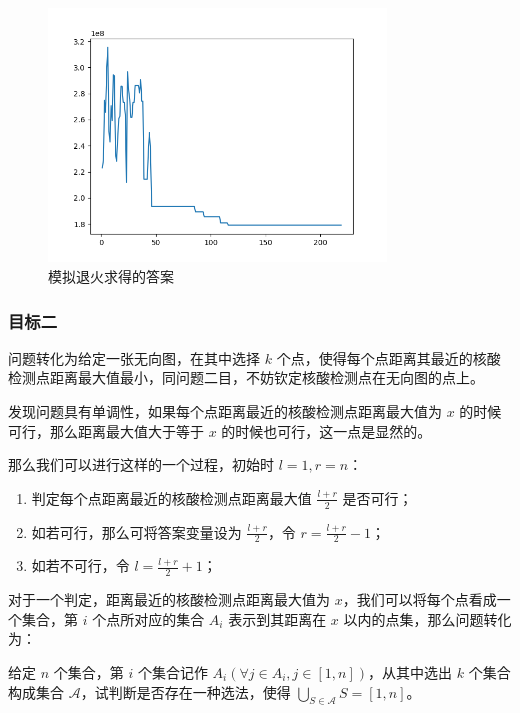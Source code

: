 \documentclass{cumcmthesis}
\begin{document}
\begin{figure}[H]
	\centering
	\includegraphics[width=0.80\textwidth]{images/SA.png}
	\caption{模拟退火求得的答案}
	\label{fig:P3T1-SA}
\end{figure}

\subsubsection{目标二}

问题转化为给定一张无向图，在其中选择 $k$ 个点，使得每个点距离其最近的核酸检测点距离最大值最小，同问题二目，不妨钦定核酸检测点在无向图的点上。

发现问题具有单调性，如果每个点距离最近的核酸检测点距离最大值为 $x$ 的时候可行，那么距离最大值大于等于 $x$ 的时候也可行，这一点是显然的。

那么我们可以进行这样的一个过程，初始时 $l=1,r=n$：

\begin{enumerate}
    \item 判定每个点距离最近的核酸检测点距离最大值 $\frac{l+r}{2}$ 是否可行；
    \item 如若可行，那么可将答案变量设为 $\frac{l+r}{2}$，令 $r = \frac{l+r}{2}-1$；
    \item 如若不可行，令 $l = \frac{l+r}{2} + 1$；
\end{enumerate}

对于一个判定，距离最近的核酸检测点距离最大值为 $x$，我们可以将每个点看成一个集合，第 $i$ 个点所对应的集合 $A_i$ 表示到其距离在 $x$ 以内的点集，那么问题转化为：

给定 $n$ 个集合，第 $i$ 个集合记作 $A_i(\forall j \in A_i, j 
\in [1,n])$，从其中选出 $k$ 个集合构成集合 $\mathscr{A}$，试判断是否存在一种选法，使得 $\bigcup\limits_{S \in \mathscr{A}} S = [1,n]$。
\end{document}
